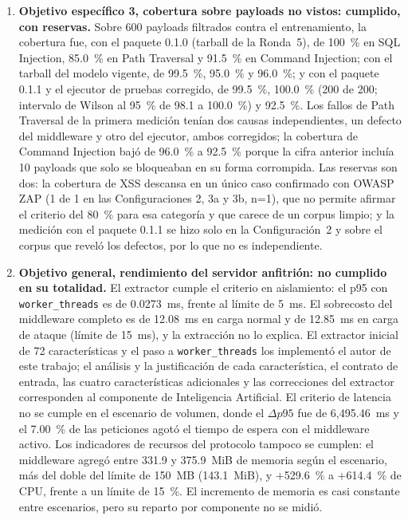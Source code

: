 \begin{enumerate}
    \item \textbf{Objetivo específico 3, cobertura sobre payloads no vistos: cumplido, con reservas.}\label{conc:cobertura}
    Sobre 600 payloads filtrados contra el entrenamiento, la cobertura fue, con el paquete 0.1.0
    (tarball de la Ronda~5), de 100~\% en SQL Injection, 85.0~\% en Path Traversal y 91.5~\% en
    Command Injection; con el tarball del modelo vigente, de 99.5~\%, 95.0~\% y 96.0~\%; y con el
    paquete 0.1.1 y el ejecutor de pruebas corregido, de 99.5~\%, 100.0~\% (200 de 200; intervalo de
    Wilson al 95~\% de 98.1 a 100.0~\%) y 92.5~\%. Los fallos de Path Traversal de la primera
    medición tenían dos causas independientes, un defecto del middleware y otro del ejecutor, ambos
    corregidos; la cobertura de Command Injection bajó de 96.0~\% a 92.5~\% porque la cifra anterior
    incluía 10 payloads que solo se bloqueaban en su forma corrompida. Las reservas son dos: la
    cobertura de XSS descansa en un único caso confirmado con OWASP ZAP (1 de 1 en las
    Configuraciones 2, 3a y 3b, n=1), que no permite afirmar el criterio del 80~\% para esa
    categoría y que carece de un corpus limpio; y la medición con el paquete 0.1.1 se hizo solo en
    la Configuración~2 y sobre el corpus que reveló los defectos, por lo que no es independiente.

    \item \textbf{Objetivo general, rendimiento del servidor anfitrión: no cumplido en su
    totalidad.}\label{conc:rendimiento} El extractor cumple el criterio en aislamiento: el p95 con
    \texttt{worker\_threads} es de 0.0273~ms, frente al límite de 5~ms. El sobrecosto del middleware
    completo es de 12.08~ms en carga normal y de 12.85~ms en carga de ataque (límite de 15~ms), y la
    extracción no lo explica. El extractor inicial de 72 características y el paso a
    \texttt{worker\_threads} los implementó el autor de este trabajo; el análisis y la justificación
    de cada característica, el contrato de entrada, las cuatro características adicionales y las
    correcciones del extractor corresponden al componente de Inteligencia Artificial. El criterio
    de latencia no se cumple en el escenario de volumen, donde el $\Delta p95$ fue de 6{,}495.46~ms
    y el 7.00~\% de las peticiones agotó el tiempo de espera con el middleware activo. Los
    indicadores de recursos del protocolo tampoco se cumplen: el middleware agregó entre 331.9 y
    375.9~MiB de memoria según el escenario, más del doble del límite de 150~MB (143.1~MiB), y
    +529.6~\% a +614.4~\% de CPU, frente a un límite de 15~\%. El incremento de memoria es casi
    constante entre escenarios, pero su reparto por componente no se midió.


\end{enumerate}
